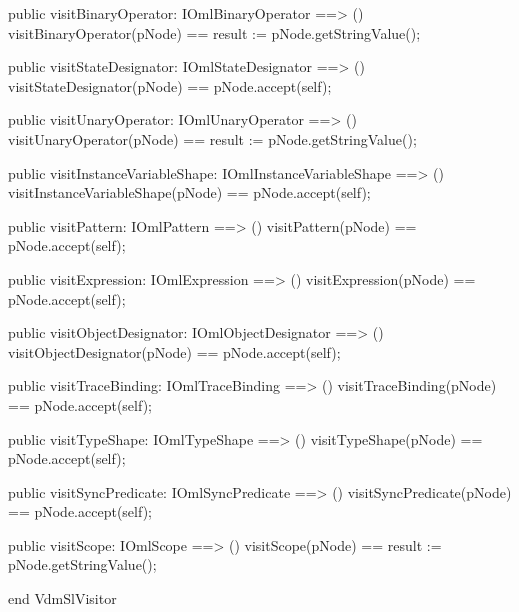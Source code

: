 \begin{vdm_al}
  public visitBinaryOperator: IOmlBinaryOperator ==> ()
  visitBinaryOperator(pNode) == result := pNode.getStringValue();

  public visitStateDesignator: IOmlStateDesignator ==> ()
  visitStateDesignator(pNode) == pNode.accept(self);

  public visitUnaryOperator: IOmlUnaryOperator ==> ()
  visitUnaryOperator(pNode) == result := pNode.getStringValue();

  public visitInstanceVariableShape: IOmlInstanceVariableShape ==> ()
  visitInstanceVariableShape(pNode) == pNode.accept(self);

  public visitPattern: IOmlPattern ==> ()
  visitPattern(pNode) == pNode.accept(self);

  public visitExpression: IOmlExpression ==> ()
  visitExpression(pNode) == pNode.accept(self);

  public visitObjectDesignator: IOmlObjectDesignator ==> ()
  visitObjectDesignator(pNode) == pNode.accept(self);

  public visitTraceBinding: IOmlTraceBinding ==> ()
  visitTraceBinding(pNode) == pNode.accept(self);

  public visitTypeShape: IOmlTypeShape ==> ()
  visitTypeShape(pNode) == pNode.accept(self);

  public visitSyncPredicate: IOmlSyncPredicate ==> ()
  visitSyncPredicate(pNode) == pNode.accept(self);

  public visitScope: IOmlScope ==> ()
  visitScope(pNode) == result := pNode.getStringValue();

end VdmSlVisitor
\end{vdm_al}
